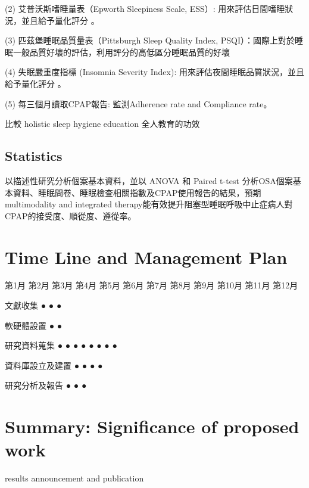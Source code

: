 \documentclass{proposalnsf}
\begin{document}
(2) 艾普沃斯嗜睡量表（Epworth Sleepiness Scale, ESS）: 用來評估日間嗜睡狀況，並且給予量化評分 。

(3) 匹茲堡睡眠品質量表（Pittsburgh Sleep Quality Index, PSQI）：國際上對於睡眠一般品質好壞的評估，利用評分的高低區分睡眠品質的好壞

(4) 失眠嚴重度指標 (Insomnia Severity Index): 用來評估夜間睡眠品質狀況，並且給予量化評分 。

(5) 每三個月讀取CPAP報告: 監測Adherence rate and Compliance rate。



比較 holistic sleep hygiene education 全人教育的功效



\subsection{Statistics}

以描述性研究分析個案基本資料，並以 ANOVA 和 Paired t-test 分析OSA個案基本資料、睡眠問卷、睡眠檢查相關指數及CPAP使用報告的結果，預期multimodality and integrated therapy能有效提升阻塞型睡眠呼吸中止症病人對CPAP的接受度、順從度、遵從率。



\section{Time Line and Management Plan}

 第1月 第2月 第3月 第4月 第5月 第6月 第7月 第8月 第9月 第10月 第11月 第12月

文獻收集 ●     ●     ● 

軟硬體設置 ●     ● 

研究資料蒐集 ●     ●      ●     ●     ●     ●      ●     ● 

資料庫設立及建置 ●      ●     ●      ● 

研究分析及報告                                                                   ●      ●      ●

\section{Summary:  Significance of proposed work}

results announcement and publication





\newpage
{}
\renewcommand{\thepage} {E--\arabic{page}}




\newpage
{}
\renewcommand{\thepage} {G--\arabic{page}}
\end{document}
